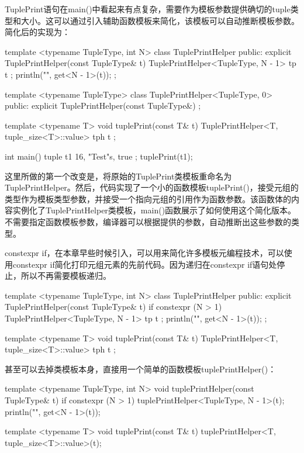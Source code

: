 TuplePrint语句在main()中看起来有点复杂，需要作为模板参数提供确切的tuple类型和大小。这可以通过引入辅助函数模板来简化，该模板可以自动推断模板参数。简化后的实现为：

\begin{cpp}
template <typename TupleType, int N>
class TuplePrintHelper
{
    public:
        explicit TuplePrintHelper(const TupleType& t) {
            TuplePrintHelper<TupleType, N - 1> tp { t };
            println("{}", get<N - 1>(t));
        }
};

template <typename TupleType>
class TuplePrintHelper<TupleType, 0>
{
    public:
        explicit TuplePrintHelper(const TupleType&) { }
};

template <typename T>
void tuplePrint(const T& t)
{
    TuplePrintHelper<T, tuple_size<T>::value> tph { t };
}

int main()
{
    tuple t1 { 16, "Test"s, true };
    tuplePrint(t1);
}
\end{cpp}

这里所做的第一个改变是，将原始的TuplePrint类模板重命名为TuplePrintHelper。然后，代码实现了一个小的函数模板tuplePrint()，接受元组的类型作为模板类型参数，并接受一个指向元组的引用作为函数参数。该函数体的内容实例化了TuplePrintHelper类模板，main()函数展示了如何使用这个简化版本。不需要指定函数模板参数，编译器可以根据提供的参数，自动推断出这些参数的类型。


constexpr if，在本章早些时候引入，可以用来简化许多模板元编程技术，可以使用constexpr if简化打印元组元素的先前代码。因为递归在constexpr if语句处停止，所以不再需要模板递归。

\begin{cpp}
template <typename TupleType, int N>
class TuplePrintHelper
{
    public:
        explicit TuplePrintHelper(const TupleType& t) {
            if constexpr (N > 1) {
                TuplePrintHelper<TupleType, N - 1> tp { t };
            }
            println("{}", get<N - 1>(t));
        }
};

template <typename T>
void tuplePrint(const T& t)
{
    TuplePrintHelper<T, tuple_size<T>::value> tph { t };
}
\end{cpp}

甚至可以去掉类模板本身，直接用一个简单的函数模板tuplePrintHelper()：

\begin{cpp}
template <typename TupleType, int N>
void tuplePrintHelper(const TupleType& t)
{
    if constexpr (N > 1) {
        tuplePrintHelper<TupleType, N - 1>(t);
    }
    println("{}", get<N - 1>(t));
}

template <typename T>
void tuplePrint(const T& t)
{
    tuplePrintHelper<T, tuple_size<T>::value>(t);
}
\end{cpp}

